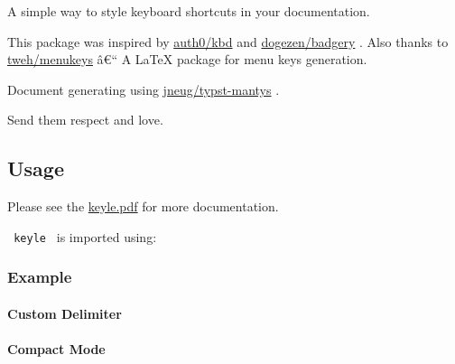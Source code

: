 A simple way to style keyboard shortcuts in your documentation.

This package was inspired by
\href{https://auth0.github.io/kbd/}{auth0/kbd} and
\href{https://github.com/dogezen/badgery}{dogezen/badgery} . Also thanks
to \href{https://github.com/tweh/menukeys}{tweh/menukeys} â€`` A LaTeX
package for menu keys generation.

Document generating using
\href{https://github.com/jneug/typst-mantys}{jneug/typst-mantys} .

Send them respect and love.

\subsection{Usage}\label{usage}

Please see the
\href{https://github.com/magicwenli/keyle/blob/main/doc/keyle.pdf}{keyle.pdf}
for more documentation.

\texttt{\ keyle\ } is imported using:

\begin{Shaded}
\begin{Highlighting}[]
\end{Highlighting}
\end{Shaded}

\subsubsection{Example}\label{example}

\paragraph{Custom Delimiter}\label{custom-delimiter}

\begin{Shaded}
\begin{Highlighting}[]
\end{Highlighting}
\end{Shaded}


\paragraph{Compact Mode}\label{compact-mode}

